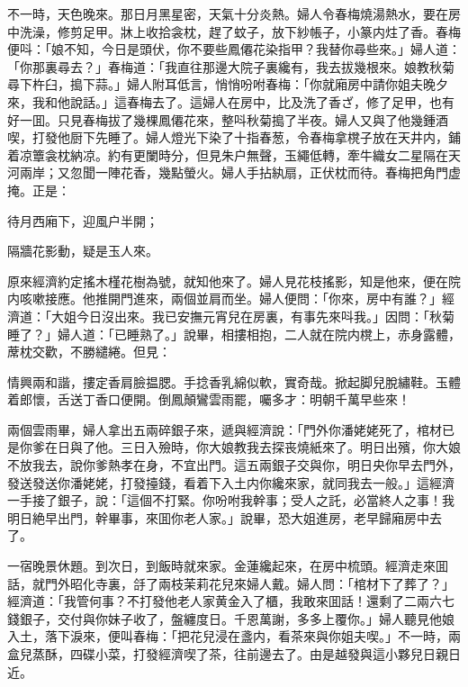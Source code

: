 不一時，天色晚來。那日月黑星密，天氣十分炎熱。婦人令春梅燒湯熱水，要在房中洗澡，修剪足甲。牀上收拾衾枕，趕了蚊子，放下紗帳子，小篆内炷了香。春梅便呌：「娘不知，今日是頭伏，你不要些鳳僊花染指甲？我替你尋些來。」婦人道：「你那裏尋去？」春梅道：「我直往那邊大院子裏纔有，我去拔幾根來。娘教秋菊尋下杵臼，搗下蒜。」婦人附耳低言，悄悄吩咐春梅：「你就廂房中請你姐夫晚夕來，我和他說話。」這春梅去了。這婦人在房中，比及洗了香ざ，修了足甲，也有好一囬。只見春梅拔了幾棵鳳僊花來，整呌秋菊搗了半夜。婦人又與了他幾鍾酒喫，打發他厨下先睡了。婦人燈光下染了十指春葱，令春梅拿櫈子放在天井内，鋪着凉簟衾枕納凉。約有更闌時分，但見朱户無聲，玉繩低轉，牽牛織女二星隔在天河兩岸；又忽聞一陣花香，幾點螢火。婦人手拈紈扇，正伏枕而待。春梅把角門虚掩。正是：

\begin{myquote}
待月西廂下，迎風户半開；

隔牆花影動，疑是玉人來。
\end{myquote}

原來經濟約定搖木槿花樹為號，就知他來了。婦人見花枝搖影，知是他來，便在院内咳嗽接應。他推開門進來，兩個並肩而坐。婦人便問：「你來，房中有誰？」經濟道：「大姐今日沒出來。我已安撫元宵兒在房裏，有事先來呌我。」因問：「秋菊睡了？」婦人道：「已睡熟了。」說畢，相摟相抱，二人就在院内櫈上，赤身露體，蓆枕交歡，不勝繾綣。但見：

\begin{myquote}
情興兩和諧，摟定香肩臉揾腮。手捻香乳綿似軟，實奇哉。掀起脚兒脫繡鞋。玉體着郎懷，舌送丁香口便開。倒鳳顛鸞雲雨罷，囑多才：明朝千萬早些來！
\end{myquote}

兩個雲雨畢，婦人拿出五兩碎銀子來，遞與經濟說：「門外你潘姥姥死了，棺材已是你爹在日與了他。三日入殮時，你大娘教我去探丧燒紙來了。明日出殯，你大娘不放我去，說你爹熱孝在身，不宜出門。這五兩銀子交與你，明日央你早去門外，發送發送你潘姥姥，打發擡錢，看着下入土内你纔來家，就同我去一般。」這經濟一手接了銀子，說：「這個不打緊。你吩咐我幹事；受人之託，必當終人之事！我明日絶早出門，幹畢事，來囬你老人家。」說畢，恐大姐進房，老早歸廂房中去了。

一宿晚景休題。到次日，到飯時就來家。金蓮纔起來，在房中梳頭。經濟走來囬話，就門外昭化寺裏，㧱了兩枝茉莉花兒來婦人戴。婦人問：「棺材下了葬了？」經濟道：「我管何事？不打發他老人家黄金入了櫃，我敢來囬話！還剩了二兩六七錢銀子，交付與你妹子收了，盤纏度日。千恩萬謝，多多上覆你。」婦人聽見他娘入土，落下淚來，便叫春梅：「把花兒浸在盞内，看茶來與你姐夫喫。」不一時，兩盒兒蒸酥，四碟小菜，打發經濟喫了茶，往前邊去了。由是越發與這小夥兒日親日近。


